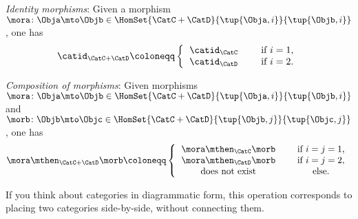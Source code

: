 \begin{ctdefinition}
\begin{compactenum}
        \item \emph{Identity morphisms}: Given a morphism~$\mora\colon \Obja \mto \Objb\in \HomSet{\CatC + \CatD}{\tup{\Obja, i}}{\tup{\Objb, i}}$, one has
        \begin{equation}
            \catid_{\CatC+\CatD} \coloneqq
            \left\{
            \begin{tabular}{ccc}
                $\catid_\CatC$ & & if $i=1$, \\
                $\catid_\CatD$ & & if $i=2$.
            \end{tabular}
            \right.
        \end{equation}
        \item \emph{Composition of morphisms}: Given morphisms~$\mora\colon \Obja \mto \Objb\in \HomSet{\CatC + \CatD}{\tup{\Obja, i}}{\tup{\Objb, i}}$ and~$\morb\colon \Objb\mto \Objc\in \HomSet{\CatC + \CatD}{\tup{\Objb, j}}{\tup{\Objc, j}}$, one has
        \begin{equation}
            \mora \mthen_{\CatC+\CatD} \morb \coloneqq
            \left\{
            \begin{tabular}{ccc}
                $\mora\mthen_\CatC \morb$  & & if $i=j = 1$,  \\
                $\mora \mthen_\CatD \morb$ & & if $i = j =2$, \\
                does not exist             & & else.
            \end{tabular}
            \right.
        \end{equation}
    \end{compactenum}
\end{ctdefinition}

\begin{remark}
    If you think about categories in diagrammatic form, this operation corresponds to placing two categories side-by-side, without connecting them.
\end{remark}

